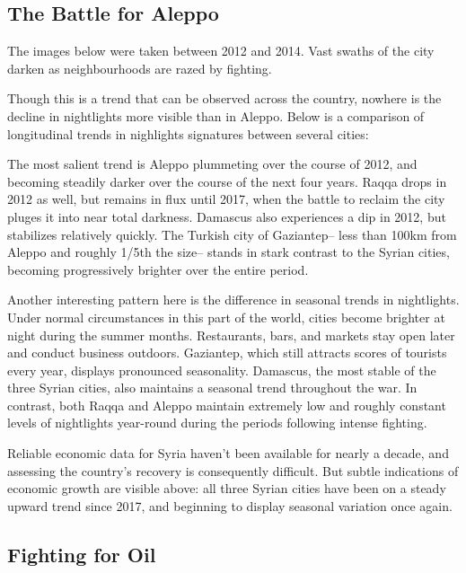 \documentclass[
  letterpaper,
  DIV=11,
  numbers=noendperiod]{scrreprt}
\begin{document}
\hypertarget{the-battle-for-aleppo}{%
\subsection*{The Battle for Aleppo}\label{the-battle-for-aleppo}}

The images below were taken between 2012 and 2014. Vast swaths of the
city darken as neighbourhoods are razed by fighting.

Though this is a trend that can be observed across the country, nowhere
is the decline in nightlights more visible than in Aleppo. Below is a
comparison of longitudinal trends in nighlights signatures between
several cities:

The most salient trend is Aleppo plummeting over the course of 2012, and
becoming steadily darker over the course of the next four years. Raqqa
drops in 2012 as well, but remains in flux until 2017, when the battle
to reclaim the city pluges it into near total darkness. Damascus also
experiences a dip in 2012, but stabilizes relatively quickly. The
Turkish city of Gaziantep-- less than 100km from Aleppo and roughly
1/5th the size-- stands in stark contrast to the Syrian cities, becoming
progressively brighter over the entire period.

Another interesting pattern here is the difference in seasonal trends in
nightlights. Under normal circumstances in this part of the world,
cities become brighter at night during the summer months. Restaurants,
bars, and markets stay open later and conduct business outdoors.
Gaziantep, which still attracts scores of tourists every year, displays
pronounced seasonality. Damascus, the most stable of the three Syrian
cities, also maintains a seasonal trend throughout the war. In contrast,
both Raqqa and Aleppo maintain extremely low and roughly constant levels
of nightlights year-round during the periods following intense fighting.

Reliable economic data for Syria haven't been available for nearly a
decade, and assessing the country's recovery is consequently difficult.
But subtle indications of economic growth are visible above: all three
Syrian cities have been on a steady upward trend since 2017, and
beginning to display seasonal variation once again.

\hypertarget{fighting-for-oil}{%
\subsection*{Fighting for Oil}\label{fighting-for-oil}}
\end{document}
